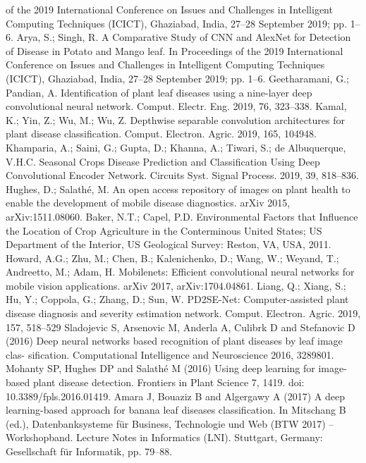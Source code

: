 \documentclass[11pt]{report}
\begin{document}
\begin{thebibliography}{100}
	of the 2019 International Conference on Issues and Challenges in Intelligent Computing Techniques (ICICT), Ghaziabad, India,
	27–28 September 2019; pp. 1–6.
	 Arya, S.; Singh, R. A Comparative Study of CNN and AlexNet for Detection of Disease in Potato and Mango leaf. In Proceedings
	of the 2019 International Conference on Issues and Challenges in Intelligent Computing Techniques (ICICT), Ghaziabad, India,
	27–28 September 2019; pp. 1–6.
	 Geetharamani, G.; Pandian, A. Identification of plant leaf diseases using a nine-layer deep convolutional neural network. Comput.
	Electr. Eng. 2019, 76, 323–338.
	 Kamal, K.; Yin, Z.; Wu, M.; Wu, Z. Depthwise separable convolution architectures for plant disease classification. Comput.
	Electron. Agric. 2019, 165, 104948.
	 Khamparia, A.; Saini, G.; Gupta, D.; Khanna, A.; Tiwari, S.; de Albuquerque, V.H.C. Seasonal Crops Disease Prediction and
	Classification Using Deep Convolutional Encoder Network. Circuits Syst. Signal Process. 2019, 39, 818–836.
	 Hughes, D.; Salathé, M. An open access repository of images on plant health to enable the development of mobile disease
	diagnostics. arXiv 2015, arXiv:1511.08060.
	 Baker, N.T.; Capel, P.D. Environmental Factors that Influence the Location of Crop Agriculture in the Conterminous United States; US
	Department of the Interior, US Geological Survey: Reston, VA, USA, 2011.
	 Howard, A.G.; Zhu, M.; Chen, B.; Kalenichenko, D.; Wang, W.; Weyand, T.; Andreetto, M.; Adam, H. Mobilenets: Efficient
	convolutional neural networks for mobile vision applications. arXiv 2017, arXiv:1704.04861.
	 Liang, Q.; Xiang, S.; Hu, Y.; Coppola, G.; Zhang, D.; Sun, W. PD2SE-Net: Computer-assisted plant disease diagnosis and severity
	estimation network. Comput. Electron. Agric. 2019, 157, 518–529
	\bibitem{} Sladojevic S, Arsenovic M, Anderla A, Culibrk D and Stefanovic D (2016)
	Deep neural networks based recognition of plant diseases by leaf image clas-
	sification. Computational Intelligence and Neuroscience 2016, 3289801.
	\bibitem{} Mohanty SP, Hughes DP and Salathé M (2016) Using deep learning for
	image-based plant disease detection. Frontiers in Plant Science 7, 1419.
	doi: 10.3389/fpls.2016.01419.
	\bibitem{} Amara J, Bouaziz B and Algergawy A (2017) A deep learning-based
	approach for banana leaf diseases classification. In Mitschang B (ed.),
	Datenbanksysteme für Business, Technologie und Web (BTW 2017) –
	Workshopband. Lecture Notes in Informatics (LNI). Stuttgart, Germany:
	Gesellschaft für Informatik, pp. 79–88.

\end{thebibliography}
\end{document}
